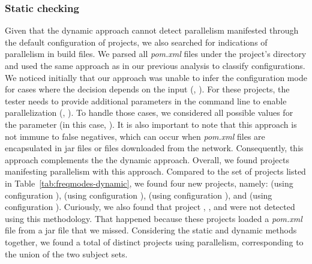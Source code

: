 \subsubsection{Static checking}
\label{sec:rqC-2}
Given that the dynamic approach cannot detect parallelism manifested
through the default
configuration of projects, we also searched for indications of parallelism in build
files.  We
parsed all \emph{pom.xml} files under the project's directory and used
the same approach as in our previous analysis to classify
configurations.  We noticed initially that our approach was unable to
infer the configuration mode for cases where the decision depends on
the input (\eg,
). For these
projects, the tester needs to provide additional parameters in the
command line to enable parallelization (\eg, ). To handle those cases, we
considered all possible values for the parameter (in this case,
).  It is also important to note that this
approach is not immune to false negatives, which can occur when
\emph{pom.xml} files are encapsulated in jar files or files downloaded from
the network.  Consequently, this approach complements the
the dynamic approach. Overall, we found \numProjectsParStatic{}
projects manifesting parallelism with this approach.
Compared to the set of projects listed in
Table~\ref{tab:freqmodes-dynamic}, we found four new projects, namely:
 (using
configuration \ParClassParMeth),  (using configuration
\ForkSeq{}),  (using configuration \ForkSeq), and
 (using configuration \ParClassParMeth).
Curiously, we also found that project , ,
and  were not detected using this methodology.
That happened because these projects loaded a \emph{pom.xml} file from
a jar file that we missed.
Considering the static and dynamic methods together, we found a total
of \numProjectsParTotal{} distinct projects using parallelism,
corresponding to the union of the two subject sets.

\begin{center}
\end{center}

